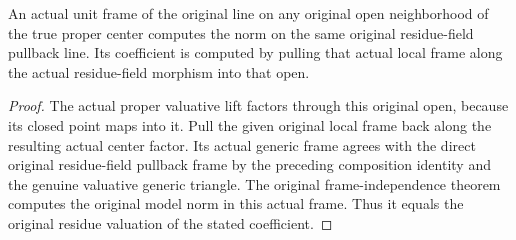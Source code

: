 \begin{corollary}
\label{cor:actual-line-model-norm-local-frame}
\leanok
{}
An actual unit frame of the original line on any original open
neighborhood of the true proper center computes the norm on the
same original residue-field pullback line. Its coefficient is
computed by pulling that actual local frame along the actual
residue-field morphism into that open.
\end{corollary}
\begin{proof}
The actual proper valuative lift factors through this original
open, because its closed point maps into it. Pull the given
original local frame back along the resulting actual center
factor. Its actual generic frame agrees with the direct original
residue-field pullback frame by the preceding composition
identity and the genuine valuative generic triangle. The original
frame-independence theorem computes the original model norm in
this actual frame. Thus it equals the original residue valuation
of the stated coefficient.
\end{proof}
